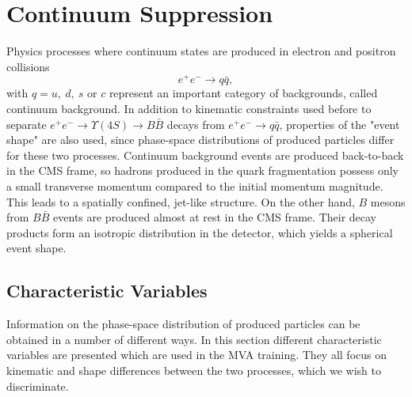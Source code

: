 \section{Continuum Suppression}

Physics processes where continuum states are produced in electron and positron collisions $$e^+ e^- \to q \bar q,$$ 
with $q = u,~d,~s$ or $c$ represent an important category of backgrounds, called continuum background. In addition to kinematic constraints used before to separate $e^+ e^- \to \Upsilon(4S) \to B \bar B$ decays from $e^+ e^- \to q \bar q$, properties of the "event shape" are also used, since phase-space distributions of produced particles differ for these two processes. Continuum background events are produced back-to-back in the CMS frame, so hadrons produced in the quark fragmentation possess only a small transverse momentum compared to the initial momentum magnitude. This leads to a spatially confined, jet-like structure. On the other hand, $B$ mesons from $B \bar B$ events are produced almost at rest in the CMS frame. Their decay products form an isotropic distribution in the detector, which yields a spherical event shape.

\subsection{Characteristic Variables}
\label{ss:charvar}
Information on the phase-space distribution of produced particles can be obtained in a number of different ways. In this section different characteristic variables are presented which are used in the MVA training. They all focus on kinematic and shape differences between the two processes, which we wish to discriminate. 


